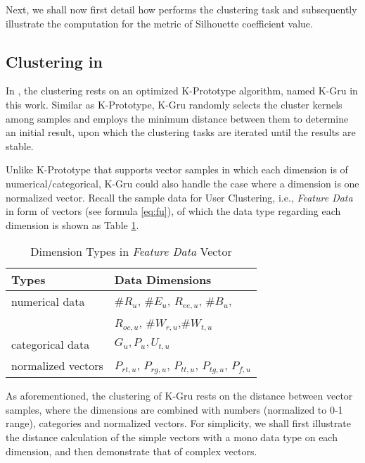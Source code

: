Next, we shall now first detail how \sys{} performs the clustering task and subsequently illustrate the computation for the metric of Silhouette coefficient value.

\subsection{Clustering in \sys{}}
\label{sec:cluster}

In \sys{}, the clustering rests on an optimized K-Prototype \cite{IEEEexample:huang1997clustering} algorithm, named K-Gru in this work.
Similar as K-Prototype, K-Gru randomly selects the cluster kernels among samples and employs the minimum distance between them to determine an initial result, upon which the clustering tasks are iterated until the results are stable.

Unlike K-Prototype that supports vector samples in which each dimension is of numerical/categorical, K-Gru could also handle the case where a dimension is one normalized vector.
%
Recall the sample data for User Clustering, i.e., \textit{Feature Data} in form of vectors (see formula \ref{eq:fu}), of which the data type regarding each dimension is shown as Table \ref{tbl:data-type}.

\begin{table}[tb!]
\centering
\begin{small}
\caption{Dimension Types in \textit{Feature Data} Vector}
\vspace{0.3cm}
\label{tbl:data-type}
\begin{tabular}{ll}
\toprule
\multicolumn{1}{l}{\textbf{Types}} & \multicolumn{1}{l}{\textbf{Data Dimensions}}	\\	\midrule \midrule
numerical data				& $\#R_u$, $\#E_u$, $R_{ee,u}$, $\#B_u$,\\
                            &  $R_{oc,u}$, $\#W_{r,u}$,$\#W_{t,u}$				\\	\midrule
categorical data			& $G_u, P_u, U_{t,u}$				\\	\midrule
normalized vectors			& $P_{rt,u}$, $P_{rg,u}$, $P_{tt,u}$, $P_{tg,u}$, $P_{f,u}$			\\ \bottomrule
\end{tabular}
\end{small}
\end{table}

As aforementioned, the clustering of K-Gru rests on the distance between vector samples, where the dimensions are combined with numbers (normalized to 0-1 range), categories and normalized vectors. For simplicity, we shall first illustrate the distance calculation of the simple vectors with a mono data type on each dimension, and then demonstrate that of complex vectors.


